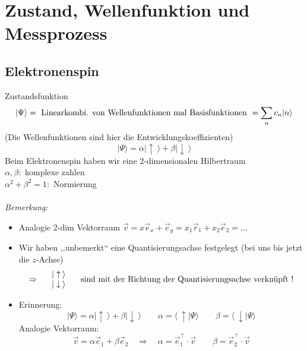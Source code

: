\section{Zustand, Wellenfunktion und Messprozess}

\subsection{Elektronenspin}

Zustandsfunktion
\begin{equation*}
|\Psi\rangle = \textrm{ Linearkombi. von Wellenfunktionen mal Basisfunktionen } = \sum_n c_n |n\rangle
\end{equation*}
(Die Wellenfunktionen sind hier die Entwicklungskoeffizienten)
\begin{equation*}
|\Psi \rangle = \alpha |\uparrow \: \rangle + \beta |\downarrow \: \rangle
\end{equation*}
Beim Elektronenspin haben wir eine 2-dimensionalen Hilbertraum \mau\\[5pt]
$ \alpha, \beta : $ komplexe zahlen\\
$ \alpha^2 + \beta^2 = 1 : $ Normierung\\[5pt]
\\[5pt]
\emph{Bemerkung:}
\begin{itemize}
	\item Analogie 2-dim Vektorraum $ \vec{v} = x \vec{e}_x +  \vec{e}_y = x_1 \vec{r}_1 + x_2 \vec{e}_2 = \dots $
	\item Wir haben ,,unbemerkt`` eine Quantisierungsachse festgelegt (bei uns bis jetzt die $ z $-Achse)\\
	\begin{equation*}
	\Rightarrow \quad \begin{array}{l}
	| \uparrow \: \rangle \\ | \downarrow \: \rangle
	\end{array} \quad \textrm{ sind mit der Richtung der Quantisierungsachse verknüpft !}
	\end{equation*}
	\item  Erinnerung:
	\begin{equation*}
	|\Psi\rangle = \alpha | \uparrow \: \rangle + \beta | \downarrow \: \rangle \qquad \alpha = \langle \: \uparrow | \Psi \rangle \qquad \beta = \langle \: \downarrow | \Psi \rangle
	\end{equation*}
	Analogie Vektorraum:
	$$ \vec{v} = \alpha \vec{e}_1 + \beta \vec{e}_2 \quad \Rightarrow \quad \alpha = \vec{e}_1^\top \cdot \vec{v} \qquad \beta = \vec{e}_2^\top \cdot \vec{v} $$
\end{itemize}

